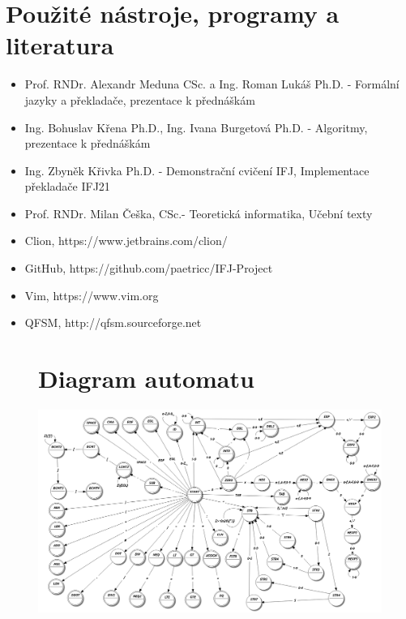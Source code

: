 \documentclass[12pt, letterpaper]{article}
\begin{document}
	\section{Použité nástroje, programy a literatura}

\begin{itemize}
\normalsize
  \item Prof. RNDr. Alexandr Meduna CSc. a Ing. Roman Lukáš Ph.D. - Formální jazyky a překladače, prezentace k přednáškám
  \item Ing. Bohuslav Křena Ph.D., Ing. Ivana Burgetová Ph.D. - Algoritmy, prezentace k přednáškám
  \item Ing. Zbyněk Křivka Ph.D. - Demonstrační cvičení IFJ, Implementace překladače IFJ21
  \item Prof. RNDr. Milan Češka, CSc.- Teoretická informatika, Učební texty
  \item Clion, https://www.jetbrains.com/clion/
  \item GitHub, https://github.com/paetricc/IFJ-Project
  \item Vim, https://www.vim.org
  \item QFSM, http://qfsm.sourceforge.net
  
\end{itemize}
	\begin{figure}
        \section{Diagram automatu}
	        \includegraphics[width=\textwidth,height=\textheight,keepaspectratio]{LexAnalyzatorFSM.png}
    \end{figure}
    \newpage
	
    \newpage
	
 \newpage
\end{document}
